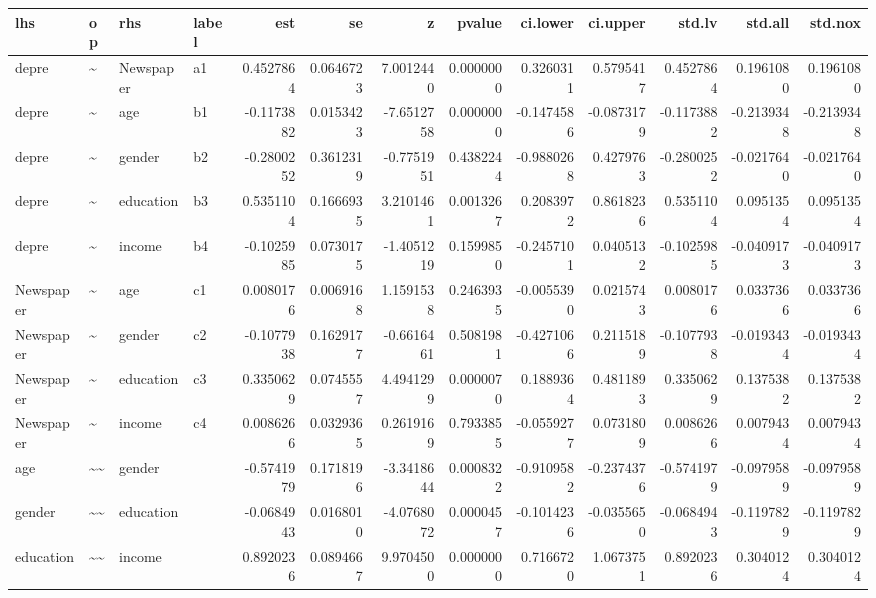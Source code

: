 \documentclass[
]{article}
\begin{document}
\begin{table}[!h]
\centering
\begin{tabular}[t]{llllrrrrrrrrr}
\toprule
lhs & op & rhs & label & est & se & z & pvalue & ci.lower & ci.upper & std.lv & std.all & std.nox\\
\midrule
depre & \textasciitilde{} & Newspaper & a1 & 0.4527864 & 0.0646723 & 7.0012440 & 0.0000000 & 0.3260311 & 0.5795417 & 0.4527864 & 0.1961080 & 0.1961080\\
depre & \textasciitilde{} & age & b1 & -0.1173882 & 0.0153423 & -7.6512758 & 0.0000000 & -0.1474586 & -0.0873179 & -0.1173882 & -0.2139348 & -0.2139348\\
depre & \textasciitilde{} & gender & b2 & -0.2800252 & 0.3612319 & -0.7751951 & 0.4382244 & -0.9880268 & 0.4279763 & -0.2800252 & -0.0217640 & -0.0217640\\
depre & \textasciitilde{} & education & b3 & 0.5351104 & 0.1666935 & 3.2101461 & 0.0013267 & 0.2083972 & 0.8618236 & 0.5351104 & 0.0951354 & 0.0951354\\
depre & \textasciitilde{} & income & b4 & -0.1025985 & 0.0730175 & -1.4051219 & 0.1599850 & -0.2457101 & 0.0405132 & -0.1025985 & -0.0409173 & -0.0409173\\
\addlinespace
Newspaper & \textasciitilde{} & age & c1 & 0.0080176 & 0.0069168 & 1.1591538 & 0.2463935 & -0.0055390 & 0.0215743 & 0.0080176 & 0.0337366 & 0.0337366\\
Newspaper & \textasciitilde{} & gender & c2 & -0.1077938 & 0.1629177 & -0.6616461 & 0.5081981 & -0.4271066 & 0.2115189 & -0.1077938 & -0.0193434 & -0.0193434\\
Newspaper & \textasciitilde{} & education & c3 & 0.3350629 & 0.0745557 & 4.4941299 & 0.0000070 & 0.1889364 & 0.4811893 & 0.3350629 & 0.1375382 & 0.1375382\\
Newspaper & \textasciitilde{} & income & c4 & 0.0086266 & 0.0329365 & 0.2619169 & 0.7933855 & -0.0559277 & 0.0731809 & 0.0086266 & 0.0079434 & 0.0079434\\
age & \textasciitilde{}\textasciitilde{} & gender &  & -0.5741979 & 0.1718196 & -3.3418644 & 0.0008322 & -0.9109582 & -0.2374376 & -0.5741979 & -0.0979589 & -0.0979589\\
\addlinespace
gender & \textasciitilde{}\textasciitilde{} & education &  & -0.0684943 & 0.0168010 & -4.0768072 & 0.0000457 & -0.1014236 & -0.0355650 & -0.0684943 & -0.1197829 & -0.1197829\\
education & \textasciitilde{}\textasciitilde{} & income &  & 0.8920236 & 0.0894667 & 9.9704500 & 0.0000000 & 0.7166720 & 1.0673751 & 0.8920236 & 0.3040124 & 0.3040124\\

\end{tabular}
\end{table}
\end{document}

